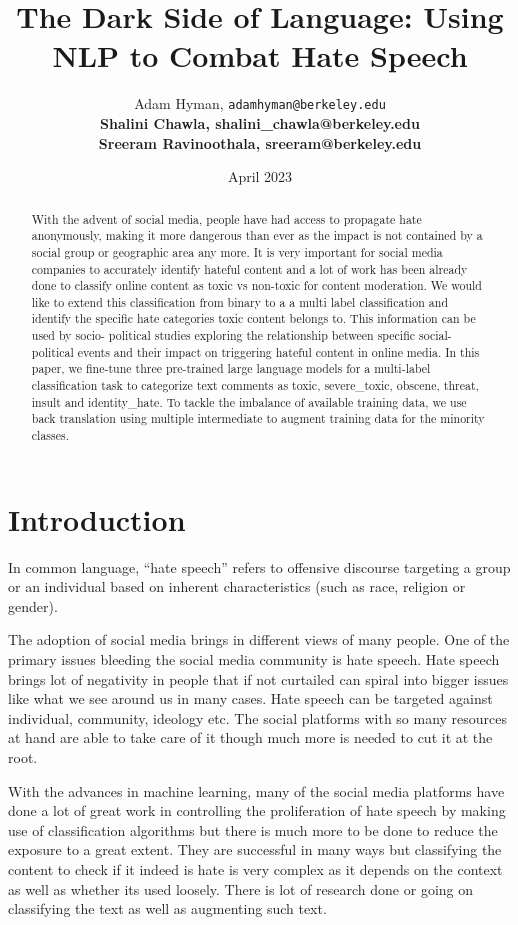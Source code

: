 \documentclass[11pt,a4paper]{article}
\title{The Dark Side of Language: Using NLP to Combat Hate Speech}
\author{ 
  Adam Hyman, 
  \texttt{adamhyman@berkeley.edu}
  \\[3ex]
  \textbf{Shalini Chawla, shalini\_chawla@berkeley.edu}
  \\[3ex]
  \textbf{Sreeram Ravinoothala, sreeram@berkeley.edu} 
  }
\date{April 2023}
\begin{document}
\maketitle
\begin{abstract}
With the advent of social media, people have had access to propagate hate anonymously, making it more dangerous than ever as the impact is not contained by a social group or geographic area any more. It is very important for social media companies to accurately identify hateful content and a lot of work has been already done to classify online content as toxic vs non-toxic for content moderation. We would like to extend this classification from binary to a a multi label classification and identify the specific hate categories toxic content belongs to. This information can be used by socio- political studies exploring the relationship between specific social-political events and their impact on triggering hateful content in online media. In this paper, we fine-tune three pre-trained large language models for a multi-label classification task to categorize text comments as toxic, severe\_toxic, obscene, threat, insult and identity\_hate. To tackle the imbalance of available training data, we use back translation using multiple intermediate to augment training data for the minority classes.

\end{abstract}

\section{Introduction}

In common language, “hate speech” refers to offensive discourse targeting a group or an individual based on inherent characteristics (such as race, religion or gender).

The adoption of social media brings in different views of many people. One of the primary issues bleeding the social media community is hate speech. Hate speech brings lot of negativity in people that if not curtailed can spiral into bigger issues like what we see around us in many cases. Hate speech can be targeted against individual, community, ideology etc. The social platforms with so many resources at hand are able to take care of it though much more is needed to cut it at the root.

With the advances in machine learning, many of the social media platforms have done a lot of great work in controlling the proliferation of hate speech by making use of classification algorithms but there is much more to be done to reduce the exposure to a great extent. They are successful in many ways but classifying the content to check if it indeed is hate is very complex as it depends on the context as well as whether its used loosely. There is lot of research done or going on classifying the text as well as augmenting such text.
\end{document}
